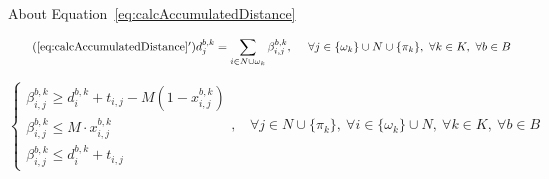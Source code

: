 \documentclass[12pt ]{article}
\begin{document}
\vspace{0.5cm}

About Equation~\ref{eq:calcAccumulatedDistance}

\begin{equation} \tag{\ref{eq:calcAccumulatedDistance}$^\prime$}
	d_j^{b,k} = \sum_{ i \in N \cup \omega_k} \beta^{b,k}_{i,j},~~~~\forall j \in \{ \omega_{k} \} \cup N \cup \{ \pi_{k} \},~\forall k \in K,~\forall b \in B
	\label{eq:calcAccumulatedDistance_linearization}
\end{equation}

\begin{equation}
	\begin{cases} 
      	\beta^{b,k}_{i,j} \ge d^{b,k}_{i} + t_{i,j} - M ( 1 - x^{b,k}_{i,j} ) \\
      	\beta^{b,k}_{i,j} \le M \cdot x^{b,k}_{i,j} \\
      	\beta^{b,k}_{i,j} \le d^{b,k}_{i} + t_{i,j}
   	\end{cases}
   	,~~~~\forall j \in N \cup \{ \pi_{k} \},~\forall i \in \{ \omega_{k} \} \cup N,~\forall k \in K,~\forall b \in B
   \label{eq:linearization_beta}
\end{equation}
\end{document}
